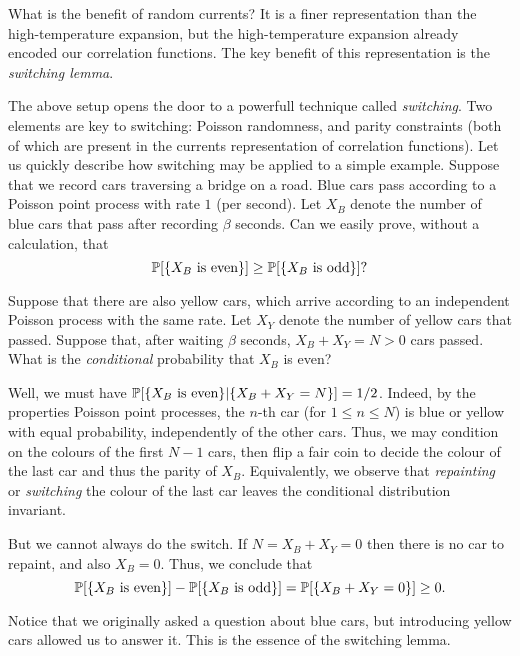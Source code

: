 What is the benefit of random currents?
It is a finer representation than the high-temperature expansion,
but the high-temperature expansion already encoded our correlation functions.
The key benefit of this representation is the \emph{switching lemma}.

\begin{remark}
    The above setup opens the door to a powerfull technique called \emph{switching}.
    Two elements are key to switching:
    Poisson randomness, and parity constraints
    (both of which are present in the currents representation of correlation functions).
    Let us quickly describe how switching may be applied to a simple example.
    Suppose that we record cars traversing a bridge on a road.
    Blue cars pass according to a Poisson point process with rate $1$ (per second).
    Let $X_B$ denote the number of blue cars that pass after recording $\beta$ seconds.
    Can we easily prove, without a calculation, that
    \[
        \P[\{\text{$X_B$ is even}\}]\geq \P[\{\text{$X_B$ is odd}\}]?
    \]

    Suppose that there are also yellow cars,
    which arrive according to an independent Poisson process with the same rate.
    Let $X_Y$ denote the number of yellow cars that passed.
    Suppose that, after waiting $\beta$ seconds, $X_B+X_Y=N>0$ cars passed.
    What is the \emph{conditional} probability that $X_B$ is even?

    Well, we must have $\P[\{\text{$X_B$ is even}\}|\{X_B+X_Y=N\}]=1/2$.
    Indeed, by the properties Poisson point processes,
    the $n$-th car (for $1\leq n\leq N$) is blue or yellow with equal probability, 
    independently of the other cars.
    Thus, we may condition on the colours of the first $N-1$ cars,
    then flip a fair coin to decide the colour of the last car
    and thus the parity of $X_B$.
    Equivalently, we observe that \emph{repainting} or \emph{switching}
    the colour of the last car leaves the conditional distribution invariant.

    But we cannot always do the switch.
    If $N=X_B+X_Y=0$
    then there is no car to repaint, and also
    $X_B=0$.
    Thus, we conclude that
    \[
        \P[\{\text{$X_B$ is even}\}]-\P[\{\text{$X_B$ is odd}\}]=\P[\{X_B+X_Y=0\}]\geq 0.
    \]
    
    Notice that we originally asked a question about blue cars,
    but introducing yellow cars allowed us to answer it.
    This is the essence of the switching lemma.
\end{remark}

